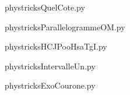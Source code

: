     

    \clearpage
    


    \newcommand{\CaptionFigQuelCote}{<+Type your caption here+>}
    \begin{center}
        
    \end{center}
    phystricksQuelCote.py

    

    \clearpage
    


    \newcommand{\CaptionFigParallelogrammeOM}{<+Type your caption here+>}
    \begin{center}
        
    \end{center}
    phystricksParallelogrammeOM.py

    

    \clearpage
    


    \newcommand{\CaptionFigHCJPooHsaTgI}{<+Type your caption here+>}
    \begin{center}
        
    \end{center}
    phystricksHCJPooHsaTgI.py

    

    \clearpage
    


    \newcommand{\CaptionFigIntervalleUn}{<+Type your caption here+>}
    \begin{center}
        
    \end{center}
    phystricksIntervalleUn.py

    

    \clearpage
    


    \newcommand{\CaptionFigExoCourone}{<+Type your caption here+>}
    \begin{center}
        
    \end{center}
    phystricksExoCourone.py

    

    \clearpage
    


